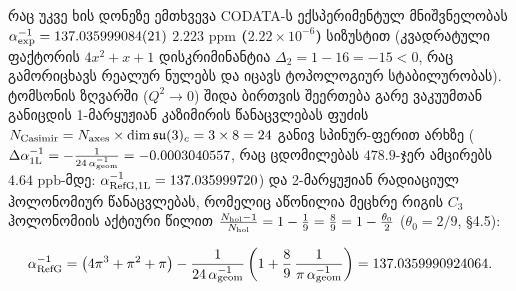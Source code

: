 \documentclass[11pt,a4paper]{article}
\begin{document}
\begin{enumerate}[label=\arabic*.]
\begin{itemize}
რაც უკვე ხის დონეზე ემთხვევა CODATA-ს ექსპერიმენტულ მნიშვნელობას $\alpha_{\rm exp}^{-1} = 137.035999084(21)$ \textbf{$2.223\text{ ppm}$ ($2.22\times 10^{-6}$)} სიზუსტით (კვადრატული ფაქტორის $4x^2 + x + 1$ დისკრიმინანტია $\Delta_2 = 1 - 16 = -15 < 0$, რაც გამორიცხავს რეალურ ნულებს და იცავს ტოპოლოგიურ სტაბილურობას). ტომსონის ზღვარში ($Q^2 \to 0$) შიდა ბირთვის შეერთება გარე ვაკუუმთან განიცდის 1-მარყუჟიან კაზიმირის წანაცვლებას ფუძის $N_{\rm Casimir} = N_{\rm axes}\times\dim\mathfrak{su}(3)_c = 3\times 8 = 24$ განივ სპინურ-ფერით არხზე ($\Delta\alpha_{1\rm L}^{-1} = -\frac{1}{24\,\alpha_{\rm geom}^{-1}} = -0.0003040557$, რაც ცდომილებას $478.9$-ჯერ ამცირებს $4.64\text{ ppb}$-მდე: $\alpha_{\rm RefG,1L}^{-1} = 137.035999720$) და 2-მარყუჟიან რადიაციულ ჰოლონომიურ წანაცვლებას, რომელიც აწონილია მეცხრე რიგის $C_3$ ჰოლონომიის აქტიური წილით $\frac{N_{\rm hol}-1}{N_{\rm hol}} = 1 - \frac{1}{9} = \frac{8}{9} = 1 - \frac{\theta_0}{2}$ ($\theta_0 = 2/9$, §4.5):

\[
   \alpha_{\rm RefG}^{-1} = \left(4\pi^3 + \pi^2 + \pi\right) - \frac{1}{24\,\alpha_{\rm geom}^{-1}}\left(1 + \frac{8}{9}\,\frac{1}{\pi\,\alpha_{\rm geom}^{-1}}\right) = 137.0359990924064.
\]


\end{itemize}
\end{enumerate}
\end{document}
